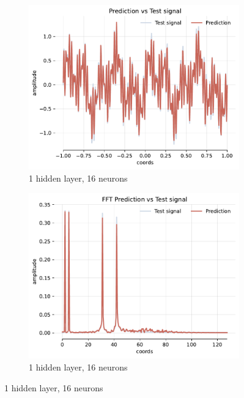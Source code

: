 \begin{figure}[h!]
    \centering
    \begin{subfigure}[b]{0.40\textwidth}
        \centering
        \includegraphics[width=\textwidth]{img/ch4/prediction_1hl_16hf_w10.pdf}
        \caption{1 hidden layer, 16 neurons}
        \label{fig:rec-1hl-16hf-w10}
    \end{subfigure}
    \begin{subfigure}[b]{0.40\textwidth}
        \centering
        \includegraphics[width=\textwidth]{img/ch4/fft_1hl_16hf_w10.pdf}
        \caption{1 hidden layer, 16 neurons}
        \label{fig:fft-1hl-16hf-w10}
    \end{subfigure}
    

\end{figure}
